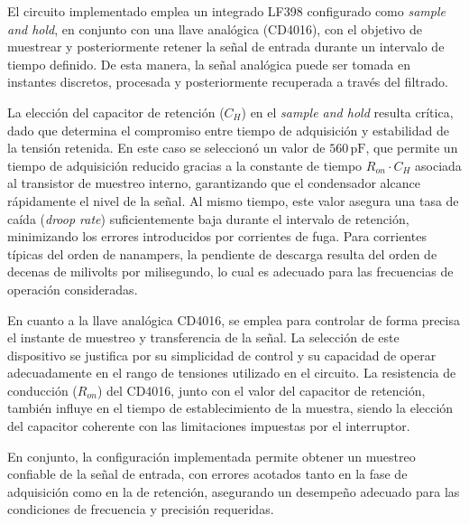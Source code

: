 El circuito implementado emplea un integrado LF398 configurado como \textit{sample and hold}, en conjunto 
con una llave analógica (CD4016), con el objetivo de muestrear y posteriormente retener la señal de entrada 
durante un intervalo de tiempo definido. De esta manera, la señal analógica puede ser tomada en instantes 
discretos, procesada y posteriormente recuperada a través del filtrado.

La elección del capacitor de retención (\(C_H\)) en el \textit{sample and hold} resulta crítica, dado que
 determina el compromiso entre tiempo de adquisición y estabilidad de la tensión retenida. En este caso 
 se seleccionó un valor de \(560\,\text{pF}\), que permite un tiempo de adquisición reducido gracias a la
  constante de tiempo \(R_{on} \cdot C_H\) asociada al transistor de muestreo interno, garantizando que el
   condensador alcance rápidamente el nivel de la señal. Al mismo tiempo, este valor asegura una tasa de 
   caída (\textit{droop rate}) suficientemente baja durante el intervalo de retención, minimizando los 
   errores introducidos por corrientes de fuga. Para corrientes típicas del orden de nanampers, la 
   pendiente de descarga resulta del orden de decenas de milivolts por milisegundo, lo cual es adecuado
    para las frecuencias de operación consideradas.

En cuanto a la llave analógica CD4016, se emplea para controlar de forma precisa el instante de muestreo
 y transferencia de la señal. La selección de este dispositivo se justifica por su simplicidad de control
  y su capacidad de operar adecuadamente en el rango de tensiones utilizado en el circuito. La resistencia
   de conducción (\(R_{on}\)) del CD4016, junto con el valor del capacitor de retención, también influye 
   en el tiempo de establecimiento de la muestra, siendo la elección del capacitor coherente con las 
   limitaciones impuestas por el interruptor.

En conjunto, la configuración implementada permite obtener un muestreo confiable de la señal de entrada,
 con errores acotados tanto en la fase de adquisición como en la de retención, asegurando un desempeño 
 adecuado para las condiciones de frecuencia y precisión requeridas.